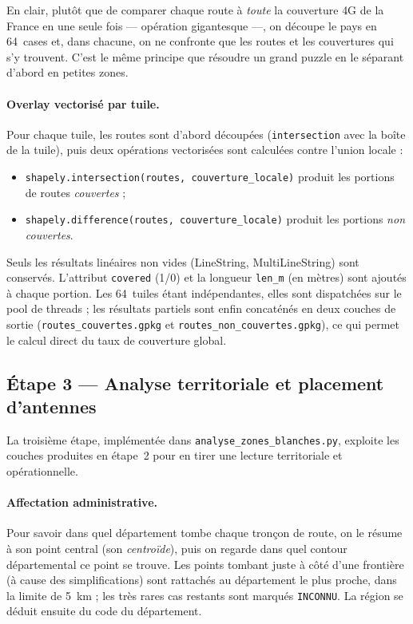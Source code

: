\documentclass[11pt,a4paper]{article}
\begin{document}
En clair, plutôt que de comparer chaque route à \emph{toute} la couverture 4G de la France en une seule fois — opération gigantesque —, on découpe le pays en 64~cases et, dans chacune, on ne confronte que les routes et les couvertures qui s'y trouvent. C'est le même principe que résoudre un grand puzzle en le séparant d'abord en petites zones.

\paragraph{Overlay vectorisé par tuile.}
Pour chaque tuile, les routes sont d'abord découpées (\texttt{intersection} avec la boîte de la tuile), puis deux opérations vectorisées sont calculées contre l'union locale :
\begin{itemize}
  \item \texttt{shapely.intersection(routes, couverture\_locale)} produit les portions de routes \emph{couvertes} ;
  \item \texttt{shapely.difference(routes, couverture\_locale)} produit les portions \emph{non couvertes}.
\end{itemize}
Seuls les résultats linéaires non vides (LineString, MultiLineString) sont conservés. L'attribut \texttt{covered} (1/0) et la longueur \texttt{len\_m} (en mètres) sont ajoutés à chaque portion. Les 64~tuiles étant indépendantes, elles sont dispatchées sur le pool de threads ; les résultats partiels sont enfin concaténés en deux couches de sortie (\texttt{routes\_couvertes.gpkg} et \texttt{routes\_non\_couvertes.gpkg}), ce qui permet le calcul direct du taux de couverture global.

\subsection{Étape 3 — Analyse territoriale et placement d'antennes}

La troisième étape, implémentée dans \texttt{analyse\_zones\_blanches.py}, exploite les couches produites en étape~2 pour en tirer une lecture territoriale et opérationnelle.

\paragraph{Affectation administrative.}
Pour savoir dans quel département tombe chaque tronçon de route, on le résume à son point central (son \emph{centroïde}), puis on regarde dans quel contour départemental ce point se trouve. Les points tombant juste à côté d'une frontière (à cause des simplifications) sont rattachés au département le plus proche, dans la limite de 5~km ; les très rares cas restants sont marqués \texttt{INCONNU}. La région se déduit ensuite du code du département.
\end{document}
